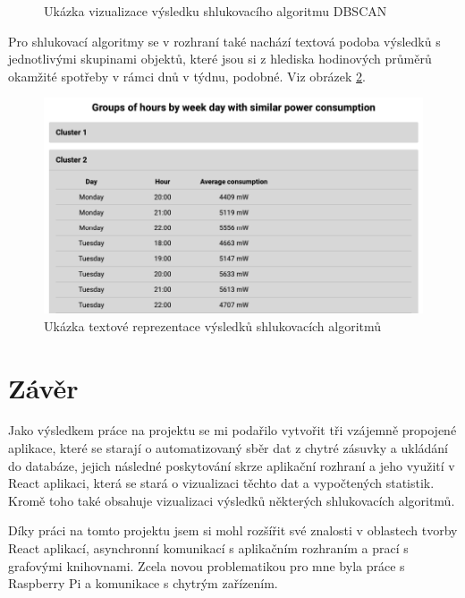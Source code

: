 \documentclass[czech,master,dept460,male,cpp,cpdeclaration,oneside]{diploma}
\begin{document}
\begin{itemize}
\begin{figure}[h!]
		\caption{Ukázka vizualizace výsledku shlukovacího algoritmu DBSCAN}
		\label{fig:React3}
	\end{figure}
\end{itemize}

\pagebreak 

Pro shlukovací algoritmy se v rozhraní také nachází textová podoba výsledků s jednotlivými skupinami objektů, které jsou si z hlediska hodinových průměrů okamžité spotřeby v rámci dnů v týdnu, podobné. Viz obrázek \ref{fig:React4}.

\begin{figure}[h!]
	\centering
	\includegraphics[width=1\textwidth]{Figures/React4.png}
	\caption{Ukázka textové reprezentace výsledků shlukovacích algoritmů}
	\label{fig:React4}
\end{figure}

\pagebreak
\section{Závěr}
Jako výsledkem práce na projektu se mi podařilo vytvořit tři vzájemně propojené aplikace, které se starají o automatizovaný sběr dat z chytré zásuvky a ukládání do databáze, jejich následné poskytování skrze aplikační rozhraní a jeho využití v React aplikaci, která se stará o vizualizaci těchto dat a vypočtených statistik. Kromě toho také obsahuje vizualizaci výsledků některých shlukovacích algoritmů.

Díky práci na tomto projektu jsem si mohl rozšířit své znalosti v oblastech tvorby React aplikací, asynchronní komunikací s aplikačním rozhraním a prací s grafovými knihovnami. Zcela novou problematikou pro mne byla práce s Raspberry Pi a komunikace s chytrým zařízením.

\clearpage

\nocite{*}
\printbibliography[title={Literatura}, heading=bibintoc]
\end{document}
